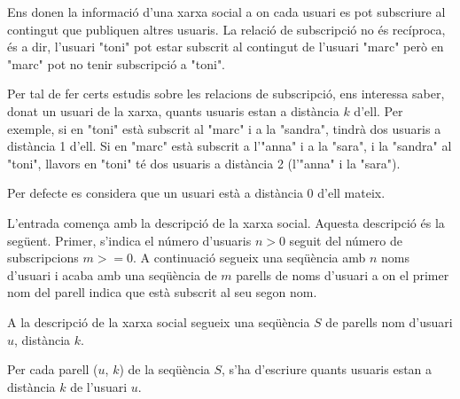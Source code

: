 

\Statement

Ens donen la informació d'una xarxa social a on cada usuari es pot subscriure al contingut que publiquen altres usuaris. La relació de subscripció no és recíproca, és a dir, l'usuari "toni" pot estar subscrit al contingut de l'usuari "marc" però en "marc" pot no tenir subscripció a "toni". 

\medskip
Per tal de fer certs estudis sobre les relacions de subscripció, ens interessa saber, donat un usuari de la xarxa, quants usuaris estan a distància $k$ d'ell. Per exemple, si en "toni" està subscrit al "marc" i a la "sandra", tindrà dos usuaris a distància 1 d'ell. Si en "marc" està subscrit a l'"anna" i a la "sara", i la "sandra" al "toni", llavors en "toni" té dos usuaris a distància 2 (l'"anna" i la "sara"). 

\medskip
Per defecte es considera que un usuari està a distància 0 d'ell mateix.

\Input

L'entrada comença amb la descripció de la xarxa social. Aquesta descripció és la següent. Primer, s'indica el número d'usuaris $n > 0$ seguit del número de subscripcions $m >= 0$. A continuació segueix una seqüència amb $n$ noms d'usuari i acaba amb una seqüència de $m$ parells de noms d'usuari a on el primer nom del parell indica que està subscrit al seu segon nom.

\medskip
A la descripció de la xarxa social segueix una seqüència $S$ de parells nom d'usuari $u$, distància $k$.


\Output

Per cada parell ($u$, $k$) de la seqüència $S$, s'ha d'escriure quants usuaris estan a distància $k$ de l'usuari $u$. 

\Sample

